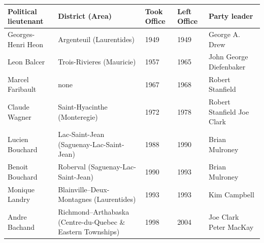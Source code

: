 \documentclass{article}
\begin{document}
\begin{tabular}{lllll}
\toprule
Political lieutenant & District (Area) & Took Office & Left Office & Party leader \\
\midrule
Georges-Henri Heon & Argenteuil (Laurentides) & 1949 & 1949 & George A. Drew \\
Leon Balcer & Trois-Rivieres (Mauricie) & 1957 & 1965 & John George Diefenbaker \\
Marcel Faribault & none & 1967 & 1968 & Robert Stanfield \\
Claude Wagner & Saint-Hyacinthe (Monteregie) & 1972 & 1978 & Robert Stanfield Joe Clark \\
Lucien Bouchard & Lac-Saint-Jean (Saguenay-Lac-Saint-Jean) & 1988 & 1990 & Brian Mulroney \\
Benoit Bouchard & Roberval (Saguenay-Lac-Saint-Jean) & 1990 & 1993 & Brian Mulroney \\
Monique Landry & Blainville--Deux-Montagnes (Laurentides) & 1993 & 1993 & Kim Campbell \\
Andre Bachand & Richmond--Arthabaska (Centre-du-Quebec \& Eastern Townships) & 1998 & 2004 & Joe Clark Peter MacKay \\
\bottomrule
\end{tabular}
\end{document}

